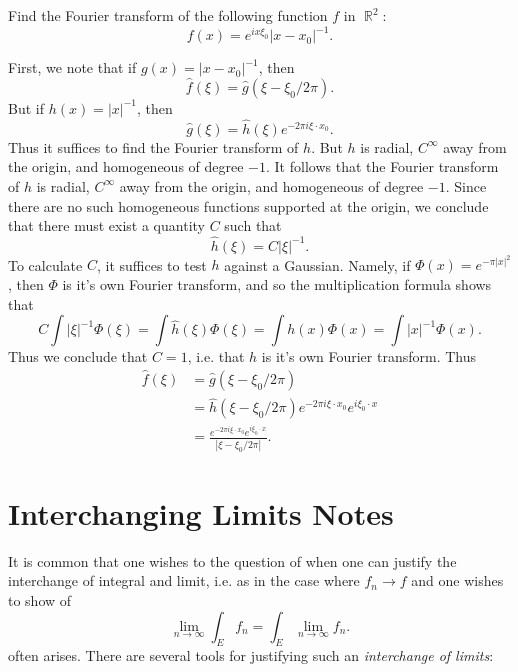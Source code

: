 \documentclass[answers]{exam}
\DeclareMathOperator{\RR}{\mathbb{R}}
\theoremstyle{problemstyle}
\newcommand{\1}[1]{\textbf{1}_{\left[#1\right]}} %
\begin{document}
\begin{questions}
\question Find the Fourier transform of the following function $f$ in $\RR^2$:
%
\[ f(x) = e^{i x \xi_0} |x - x_0|^{-1}. \]
\begin{solution}
	First, we note that if $g(x) = |x - x_0|^{-1}$, then
	\[ \widehat{f}(\xi) = \widehat{g}(\xi - \xi_0 / 2 \pi). \]
	But if $h(x) = |x|^{-1}$, then
	\[ \widehat{g}(\xi) = \widehat{h}(\xi) e^{-2 \pi i \xi \cdot x_0}. \]
	Thus it suffices to find the Fourier transform of $h$. But $h$ is radial, $C^\infty$ away from the origin, and homogeneous of degree $-1$. It follows that the Fourier transform of $h$ is radial, $C^\infty$ away from the origin, and homogeneous of degree $-1$. Since there are no such homogeneous functions supported at the origin, we conclude that there must exist a quantity $C$ such that
	\[ \widehat{h}(\xi) = C |\xi|^{-1}. \]
	To calculate $C$, it suffices to test $h$ against a Gaussian. Namely, if $\Phi(x) = e^{- \pi |x|^2}$, then $\Phi$ is it's own Fourier transform, and so the multiplication formula shows that
	\[ C \int |\xi|^{-1} \Phi(\xi) = \int \widehat{h}(\xi) \Phi(\xi) = \int h(x) \Phi(x) = \int |x|^{-1} \Phi(x). \]
	Thus we conclude that $C = 1$, i.e. that $h$ is it's own Fourier transform. Thus
	\begin{align*}
		\widehat{f}(\xi) &= \widehat{g}(\xi - \xi_0 / 2 \pi)\\
		&= \widehat{h}(\xi - \xi_0 / 2\pi) e^{-2 \pi i \xi \cdot x_0} e^{i \xi_0 \cdot x}\\
		&= \frac{e^{-2 \pi i \xi \cdot x_0} e^{i \xi_0 \cdot x}}{|\xi - \xi_0 / 2\pi|}.
	\end{align*}
\end{solution}







\newpage
\section{Interchanging Limits Notes}

It is common that one wishes to the question of when one can justify the interchange of integral and limit, i.e. as in the case where $f_n \to f$ and one wishes to show of 
\begin{equation*}
  \lim_{n\to\infty} \int_E f_{n} = \int_E \lim_{n\to\infty}  f_{n}.
\end{equation*}
often arises. There are several tools for justifying such an \textit{interchange of limits}:


\end{questions}
\end{document}
